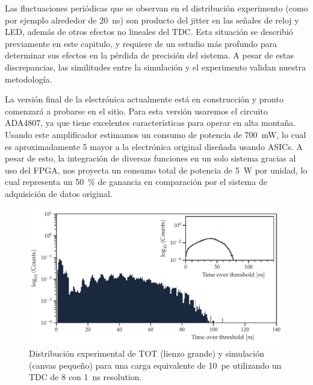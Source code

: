 Las fluctuaciones periódicas que se observan en el distribución experimento (como por ejemplo alrededor de \SI{20}{\ns}) son producto del jitter en las señales de reloj y LED, además de otros efectos no lineales del TDC. Esta situación se describió previamente en este capitulo, y requiere de un estudio más profundo para determinar sus efectos en la pérdida de precisión del sistema. A pesar de estas discrepancias, las similitudes entre la simulación y el experimento validan nuestra metodología.

La versión final de la electrónica actualmente está en construcción y pronto comenzará a probarse en el sitio. Para esta versión usaremos el circuito ADA4807, ya que tiene excelentes características para operar en alta montaña. Usando este amplificador estimamos un consumo de potencia de \SI{700}{\mW}, lo cual es aproximadamente \num{5} mayor a la electrónica original diseñada usando ASICs. A pesar de esto, la integración de diversas funciones en un solo sistema gracias al uso del FPGA, nos proyecta un consumo total de potencia de \SI{5}{\W} por unidad, lo cual representa un \SI{50}{\percent} de ganancia en comparación por el sistema de adquisición de datos original.

\begin{figure}
        \centering
        \includegraphics[width=\textwidth]{tdc_sim-exp.pdf}
        \caption{Distribución experimental de TOT (lienzo grande) y simulación (canvas pequeño) para una carga equivalente de \SI{10}{pe} utilizando un TDC de \SI{8}{\bit} con \SI{1}{\ns} resolution.}
        \label{fig:tdc-simexp}
\end{figure}

